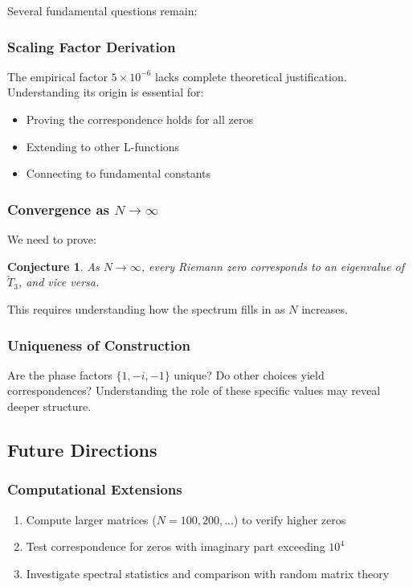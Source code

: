 \documentclass[12pt,letterpaper]{article}
\theoremstyle{plain}
\newtheorem{conjecture}[theorem]{Conjecture}
\theoremstyle{definition}
\theoremstyle{remark}
\newcommand{\modifiedop}{\tilde{T}_3}
\begin{document}
Several fundamental questions remain:

\subsubsection{Scaling Factor Derivation}
The empirical factor $5 \times 10^{-6}$ lacks complete theoretical justification. Understanding its origin is essential for:
\begin{itemize}
\item Proving the correspondence holds for all zeros
\item Extending to other L-functions
\item Connecting to fundamental constants
\end{itemize}

\subsubsection{Convergence as $N \to \infty$}
We need to prove:
\begin{conjecture}
As $N \to \infty$, every Riemann zero corresponds to an eigenvalue of $\modifiedop$, and vice versa.
\end{conjecture}

This requires understanding how the spectrum fills in as $N$ increases.

\subsubsection{Uniqueness of Construction}
Are the phase factors $\{1, -i, -1\}$ unique? Do other choices yield correspondences? Understanding the role of these specific values may reveal deeper structure.

\subsection{Future Directions}

\subsubsection{Computational Extensions}
\begin{enumerate}
\item Compute larger matrices ($N = 100, 200, ...$) to verify higher zeros
\item Test correspondence for zeros with imaginary part exceeding $10^4$
\item Investigate spectral statistics and comparison with random matrix theory
\end{enumerate}
\end{document}
